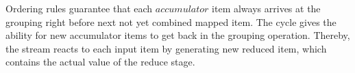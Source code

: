 Ordering rules  guarantee that each $accumulator$  item always arrives at the grouping right before next not yet combined mapped item. The cycle gives the ability for new accumulator items to get back in the grouping operation. Thereby, the stream reacts to each input item by generating new reduced item, which contains the actual value of the reduce stage.

